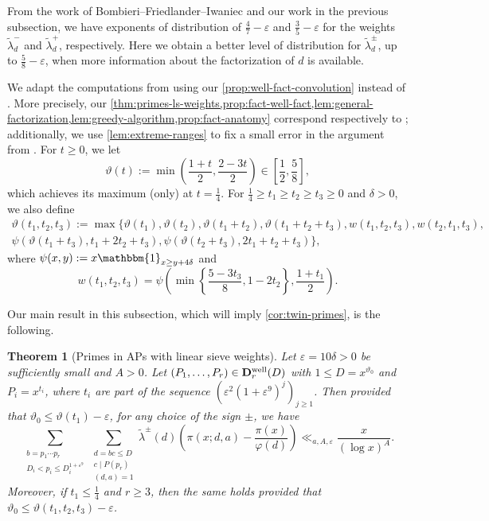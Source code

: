 \documentclass[reqno,11pt]{amsart}
\newtheorem{theorem}{Theorem}[section]
\theoremstyle{remark}
\numberwithin{equation}{section}
\newcommand{\bDw}{\mathbf{D}^{\textnormal{well}}}
\newcommand{\one}{\mathbbm{1}}
\newcommand{\eps}{\varepsilon}
\renewcommand{\tilde}{\widetilde}
\begin{document}
From the work of Bombieri--Friedlander--Iwaniec \cite[Theorem 10]{bombieri1986primes} and our work in the previous subsection, we have exponents of distribution of $\tfrac{4}{7} - \eps$ and $\tfrac{3}{5} - \eps$ for the weights $\tilde\lambda_d^-$ and $\tilde\lambda_d^+$, respectively. Here we obtain a better level of distribution for $\tilde\lambda_d^\pm$, up to $\tfrac{5}{8} - \eps$, when more information about the factorization of $d$ is available. 

We adapt the computations from \cite[Section 6]{lichtman2023primes} using our \cref{prop:well-fact-convolution} instead of \cite[Proposition 5.2]{lichtman2023primes}.
More precisely, our
\cref{thm:primes-ls-weights,prop:fact-well-fact,lem:general-factorization,lem:greedy-algorithm,prop:fact-anatomy} correspond respectively to \cite[Proposition 6.6, Proposition 6.1, Lemma 6.3, Lemma 6.4, Proposition 6.5]{lichtman2023primes}; additionally, we use \cref{lem:extreme-ranges} to fix a small error in the argument from \cite[Section 6]{lichtman2023primes}. For $t \ge 0$, we let
\begin{equation} \label{eq:vartheta-t}
    \vartheta(t) := \min\left(\frac{1+t}{2}, \frac{2-3t}{2}\right) \in \left[\frac{1}{2}, \frac{5}{8}\right],
\end{equation}
which achieves its maximum (only) at $t = \tfrac{1}{4}$. For $\tfrac{1}{4} \ge t_1 \ge t_2 \ge t_3 \ge 0$ and $\delta > 0$, we also define
\begin{equation} \label{eq:vartheta-123}
\begin{aligned}
    \vartheta(t_1, t_2, t_3) :=  \max\big\{\vartheta(t_1), \vartheta(t_2), \vartheta(t_1+t_2), \vartheta(t_1+t_2+t_3), 
    w(t_1, t_2, t_3), w(t_2, t_1, t_3), \\
    \psi(\vartheta(t_1+t_3), t_1+2t_2+t_3), \psi(\vartheta(t_2+t_3), 2t_1+t_2+t_3) \big\},
\end{aligned}
\end{equation}
where $\psi(x, y) := x \one_{x \ge y+4\delta}$ and
\[
    w(t_1, t_2, t_3) = \psi\left(\min\left\{\frac{5-3t_3}{8}, 1-2t_2\right\}, \frac{1+t_1}{2} \right).
\]

Our main result in this subsection, which will imply \cref{cor:twin-primes}, is the following.

\begin{theorem}[Primes in APs with linear sieve weights]\label{thm:primes-ls-weights}
Let $\eps = 10\delta > 0$ be sufficiently small and $A > 0$. Let $(P_1, \ldots, P_r) \in \bDw_r(D)$ with $1 \le D = x^{\vartheta_0}$ and $P_i = x^{t_i}$, where $t_i$ are part of the sequence $(\eps^2(1+\eps^9)^j)_{j \ge 1}$. Then provided that $\vartheta_0 \le \vartheta(t_1) - \eps$, for any choice of the sign $\pm$, we have
\[
    \sum_{\substack{b = p_1\cdots p_r \\ D_i < p_i \le D_i^{1+\eps^9}}} \sum_{\substack{d = bc \le D \\ c \mid P(p_r) \\ (d, a) = 1}}
    \tilde\lambda^\pm(d) \left( \pi(x; d, a) - \frac{\pi(x)}{\varphi(d)} \right) \ll_{a,A,\eps} \frac{x}{(\log x)^A}.
\]
Moreover, if $t_1 \le \tfrac{1}{4}$ and $r \ge 3$, then the same holds provided that $\vartheta_0 \le \vartheta(t_1, t_2, t_3) - \eps$.
\end{theorem}
\end{document}
